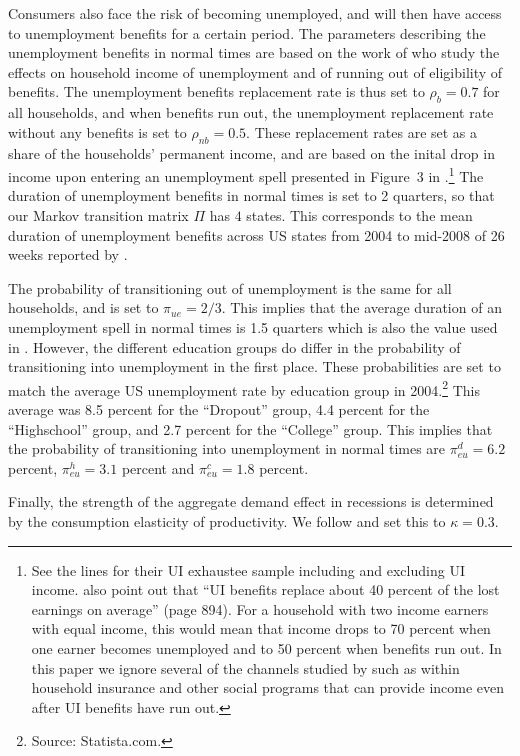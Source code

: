 \documentclass[../HAFiscal]{subfiles}
\begin{document}
Consumers also face the risk of becoming unemployed, and will then have access to unemployment benefits for a certain period. The parameters describing the unemployment benefits in normal times are based on the work of \cite{rothstein2017scraping} who study the effects on household income of unemployment and of running out of eligibility of benefits. The unemployment benefits replacement rate is thus set to $\rho_b=0.7$ for all households, and when benefits run out, the unemployment replacement rate without any benefits is set to $\rho_{nb}=0.5$. These replacement rates are set as a share of the households' permanent income, and are based on the inital drop in income upon entering an unemployment spell presented in Figure~3 in \cite{rothstein2017scraping}.\footnote{See the lines for their UI exhaustee sample including and excluding UI income. \cite{rothstein2017scraping} also point out that ``UI benefits replace about 40 percent of the lost earnings on average'' (page 894). For a household with two income earners with equal income, this would mean that income drops to 70 percent when one earner becomes unemployed and to 50 percent when benefits run out. In this paper we ignore several of the channels studied by \cite{rothstein2017scraping} such as within household insurance and other social programs that can provide income even after UI benefits have run out.} The duration of unemployment benefits in normal times is set to 2 quarters, so that our Markov transition matrix $\Pi$ has $4$ states. This corresponds to the mean duration of unemployment benefits across US states from 2004 to mid-2008 of 26 weeks reported by \cite{rothstein2017scraping}. 

The probability of transitioning out of unemployment is the same for all households, and is set to $\pi_{ue}=2/3$. This implies that the average duration of an unemployment spell in normal times is 1.5 quarters which is also the value used in \cite{carroll2020modeling}. However, the different education groups do differ in the probability of transitioning into unemployment in the first place. These probabilities are set to match the average US unemployment rate by education group in 2004.\footnote{Source: Statista.com.} This average was 8.5 percent for the ``Dropout'' group, 4.4 percent for the ``Highschool'' group, and 2.7 percent for the ``College'' group. This implies that the probability of transitioning into unemployment in normal times are $\pi_{eu}^d=6.2$ percent, $\pi_{eu}^h=3.1$ percent and $\pi_{eu}^c=1.8$ percent. 

Finally, the strength of the aggregate demand effect in recessions is determined by the consumption elasticity of productivity. We follow \cite{kmpHandbook2016} and set this to $\kappa=0.3$. 
\end{document}
